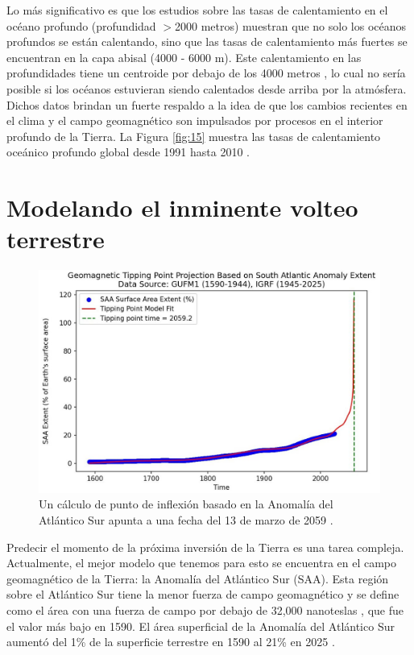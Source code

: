 \documentclass[10pt,twocolumn,letterpaper]{article}
\begin{document}
Lo más significativo es que los estudios sobre las tasas de calentamiento en el océano profundo (profundidad $>$2000 metros) muestran que no solo los océanos profundos se están calentando, sino que las tasas de calentamiento más fuertes se encuentran en la capa abisal (4000 - 6000 m). Este calentamiento en las profundidades tiene un centroide por debajo de los 4000 metros \cite{132,129}, lo cual no sería posible si los océanos estuvieran siendo calentados desde arriba por la atmósfera. Dichos datos brindan un fuerte respaldo a la idea de que los cambios recientes en el clima y el campo geomagnético son impulsados por procesos en el interior profundo de la Tierra. La Figura \ref{fig:15} muestra las tasas de calentamiento oceánico profundo global desde 1991 hasta 2010 \cite{132}.

\section{Modelando el inminente volteo terrestre}
\begin{figure}[b]
\begin{center}
   \includegraphics[width=1\linewidth]{saa-crop.jpeg}
\end{center}
   \caption{Un cálculo de punto de inflexión basado en la Anomalía del Atlántico Sur apunta a una fecha del 13 de marzo de 2059 \cite{125,126}.}
\label{fig:16}
\label{fig:onecol}
\end{figure}

Predecir el momento de la próxima inversión de la Tierra es una tarea compleja. Actualmente, el mejor modelo que tenemos para esto se encuentra en el campo geomagnético de la Tierra: la Anomalía del Atlántico Sur (SAA). Esta región sobre el Atlántico Sur tiene la menor fuerza de campo geomagnético y se define como el área con una fuerza de campo por debajo de 32,000 nanoteslas \cite{135}, que fue el valor más bajo en 1590. El área superficial de la Anomalía del Atlántico Sur aumentó del 1\% de la superficie terrestre en 1590 al 21\% en 2025 \cite{136}.
\end{document}
